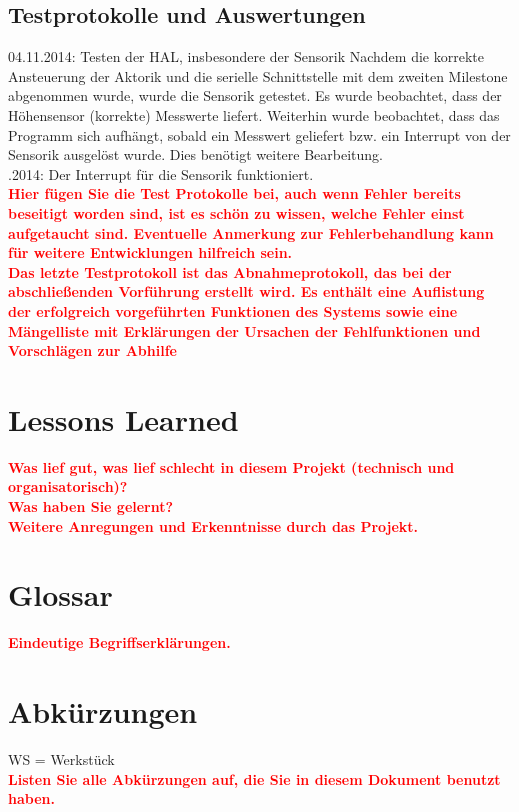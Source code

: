\documentclass[oneside,a4paper,titlepage]{scrartcl} %
\begin{document}
\subsection{Testprotokolle und Auswertungen}
04.11.2014: Testen der HAL, insbesondere der Sensorik \newline
Nachdem die korrekte Ansteuerung der Aktorik und die serielle Schnittstelle mit dem zweiten Milestone abgenommen wurde, wurde die Sensorik getestet. Es wurde beobachtet, dass der H\"ohensensor (korrekte) Messwerte liefert. Weiterhin wurde beobachtet, dass das Programm sich aufh\"angt, sobald ein Messwert geliefert bzw. ein Interrupt von der Sensorik ausgel\"ost wurde. Dies ben\"otigt weitere Bearbeitung.\\
.2014: Der Interrupt für die Sensorik funktioniert.\\
\newline
\textcolor{red}{\textbf{Hier fügen Sie die Test Protokolle bei, auch wenn Fehler bereits beseitigt
worden sind, ist es schön zu wissen, welche Fehler einst aufgetaucht sind.
Eventuelle Anmerkung zur Fehlerbehandlung kann für weitere Entwicklungen hilfreich sein.\\
Das letzte Testprotokoll ist das Abnahmeprotokoll, das bei der abschließenden Vorführung erstellt
wird. Es enthält eine Auflistung der erfolgreich vorgeführten Funktionen des Systems sowie eine
Mängelliste mit Erklärungen der Ursachen der Fehlfunktionen und Vorschlägen zur Abhilfe}}

\section{Lessons Learned}
\textcolor{red}{\textbf{Was lief gut, was lief schlecht in diesem Projekt (technisch und organisatorisch)?\\
Was haben Sie gelernt?\\
Weitere Anregungen und Erkenntnisse durch das Projekt.}}

\newpage

\section{Glossar}
\textcolor{red}{\textbf{Eindeutige Begriffserklärungen.}}

\section{Abkürzungen}
WS = Werkstück\\
\textcolor{red}{\textbf{Listen Sie alle Abkürzungen auf, die Sie in diesem Dokument benutzt haben.}}
\end{document}
